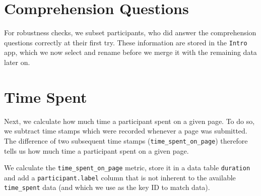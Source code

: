 \documentclass[
  a4paper,
  DIV=11,
  numbers=noendperiod]{scrreprt}
\begin{document}
\hypertarget{comprehension-questions}{%
\section{Comprehension Questions}\label{comprehension-questions}}

For robustness checks, we subset participants, who did answer the
comprehension questions correctly at their first try. These information
are stored in the \texttt{Intro} app, which we now select and rename
before we merge it with the remaining data later on.

\hypertarget{time-spent}{%
\section{Time Spent}\label{time-spent}}

Next, we calculate how much time a participant spent on a given page. To
do so, we subtract time stamps which were recorded whenever a page was
submitted. The difference of two subsequent time stamps
(\texttt{time\_spent\_on\_page}) therefore tells us how much time a
participant spent on a given page.

We calculate the \texttt{time\_spent\_on\_page} metric, store it in a
data table \texttt{duration} and add a \texttt{participant.label} column
that is not inherent to the available \texttt{time\_spent} data (and
which we use as the key ID to match data).
\end{document}
